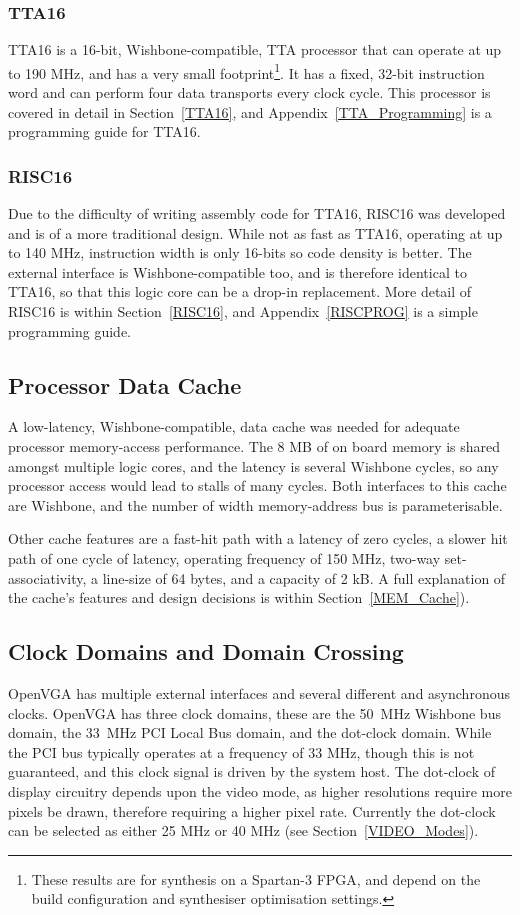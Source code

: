 \subsubsection{TTA16}
TTA16 is a 16-bit, Wishbone-compatible, TTA processor that can operate at up to
190 MHz, and has a very small footprint\footnote{These results are for synthesis
on a Spartan-3 FPGA, and depend on the build configuration and synthesiser
optimisation settings.}. It has a fixed, 32-bit instruction word and can perform
four data transports every clock cycle. This processor is covered in detail in
Section~\ref{TTA16}, and Appendix~\ref{TTA_Programming} is a programming guide
for TTA16.


\subsubsection{RISC16}
Due to the difficulty of writing assembly code for TTA16, RISC16 was developed
and is of a more traditional design. While not as fast as TTA16, operating at up
to 140 MHz, instruction width is only 16-bits so code density is better. The
external interface is Wishbone-compatible too, and is therefore identical to
TTA16, so that this logic core can be a drop-in replacement. More detail of
RISC16 is within Section~\ref{RISC16}, and Appendix~\ref{RISCPROG} is a simple
programming guide.


\subsection{Processor Data Cache}
A low-latency, Wishbone-compatible, data cache was needed for adequate processor
memory-access performance. The 8 MB of on board memory is shared amongst multiple
logic cores, and the latency is several Wishbone cycles, so any processor access
would lead to stalls of many cycles. Both interfaces to this cache are Wishbone,
and the number of width memory-address bus is parameterisable.

Other cache features are a fast-hit path with a latency of zero cycles, a slower
hit path of one cycle of latency, operating frequency of 150 MHz, two-way
set-associativity, a line-size of 64 bytes, and a capacity of 2 kB. A full
explanation of the cache's features and design decisions is within
Section~\ref{MEM_Cache}).


\subsection{Clock Domains and Domain Crossing}
OpenVGA has multiple external interfaces and several different and asynchronous
clocks. OpenVGA has three clock domains, these are the 50~MHz Wishbone bus
domain, the 33~MHz PCI Local Bus domain, and the dot-clock domain. While the PCI
bus typically operates at a frequency of 33 MHz, though this is not guaranteed,
and this clock signal is driven by the system host. The dot-clock of display
circuitry depends upon the video mode, as higher resolutions require more pixels
be drawn, therefore requiring a higher pixel rate. Currently the dot-clock can be
selected as either 25 MHz or 40 MHz (see Section~\ref{VIDEO_Modes}).

